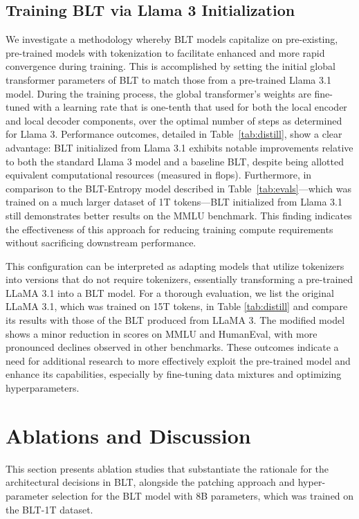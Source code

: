 \subsection{Training {\textsc BLT} via Llama 3 Initialization}
\label{sec:distillation}
We investigate a methodology whereby {\textsc BLT} models capitalize on pre-existing, pre-trained models with tokenization to facilitate enhanced and more rapid convergence during training. This is accomplished by setting the initial global transformer parameters of {\textsc BLT} to match those from a pre-trained Llama 3.1 model. During the training process, the global transformer’s weights are fine-tuned with a learning rate that is one-tenth that used for both the local encoder and local decoder components, over the optimal number of steps as determined for Llama 3. Performance outcomes, detailed in Table~\ref{tab:distill}, show a clear advantage: {\textsc BLT} initialized from Llama 3.1 exhibits notable improvements relative to both the standard Llama 3 model and a baseline {\textsc BLT}, despite being allotted equivalent computational resources (measured in flops). Furthermore, in comparison to the {\textsc BLT}-Entropy model described in Table~\ref{tab:evals}—which was trained on a much larger dataset of 1T tokens—{\textsc BLT} initialized from Llama 3.1 still demonstrates better results on the MMLU benchmark. This finding indicates the effectiveness of this approach for reducing training compute requirements without sacrificing downstream performance.

This configuration can be interpreted as adapting models that utilize tokenizers into versions that do not require tokenizers, essentially transforming a pre-trained LLaMA 3.1 into a {\textsc BLT} model. For a thorough evaluation, we list the original LLaMA 3.1, which was trained on 15T tokens, in Table \ref{tab:distill} and compare its results with those of the {\textsc BLT} produced from LLaMA 3. The modified model shows a minor reduction in scores on MMLU and HumanEval, with more pronounced declines observed in other benchmarks. These outcomes indicate a need for additional research to more effectively exploit the pre-trained model and enhance its capabilities, especially by fine-tuning data mixtures and optimizing hyperparameters.

\section{Ablations and Discussion}
\label{section:ablations}
This section presents ablation studies that substantiate the rationale for the architectural decisions in {\textsc BLT}, alongside the patching approach and hyper-parameter selection for the {\textsc BLT} model with 8B parameters, which was trained on the {\textsc BLT}-1T dataset.

